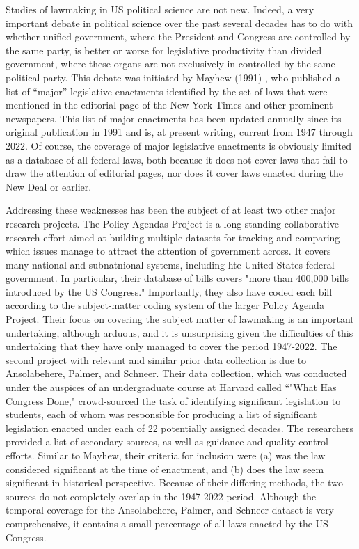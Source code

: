 \documentclass[fleqn,10pt]{wlscirep}
\begin{document}
Studies of lawmaking in US political science are not new. Indeed, a very important debate in political science over the past several decades has to do with whether unified government, where the President and Congress are controlled by the same party, is better or worse for legislative productivity than divided government, where these organs are not exclusively in controlled by the same political party. This debate was initiated by Mayhew (1991) \nocite{Mayhew1991}, who published a list of ``major'' legislative enactments identified by the set of laws that were mentioned in the editorial page of the New York Times and other prominent newspapers. This list of major enactments has been updated annually since its original publication in 1991 and is, at present writing, current from 1947 through 2022. Of course, the coverage of major legislative enactments is obviously limited as a database of all federal laws, both because it does not cover laws that fail to draw the attention of editorial pages, nor does it cover laws enacted during the New Deal or earlier. 

Addressing these weaknesses has been the subject of at least two other major research projects. The Policy Agendas Project is a long-standing collaborative research effort aimed at building multiple datasets for tracking and comparing which issues manage to attract the attention of government across. It covers many national and subnatnional systems, including hte United States federal government. In particular, their database of bills covers "more than 400,000 bills introduced by the US Congress." Importantly, they also have coded each bill according to the subject-matter coding system of the larger Policy Agenda Project. Their focus on covering the subject matter of lawmaking is an important undertaking, although arduous, and it is unsurprising given the difficulties of this undertaking that they have only managed to cover the period 1947-2022. The second project with relevant and similar prior data collection is due to Ansolabehere, Palmer, and Schneer.\cite{ansolabehere_palmer_schneer_2016,ansolabehere2018divided} Their data collection, which was conducted under the auspices of an undergraduate course at Harvard called ``"What Has Congress Done," crowd-sourced the task of identifying significant legislation to students, each of whom was responsible for producing a list of significant legislation enacted under each of 22 potentially assigned decades. The researchers provided a list of secondary sources, as well as guidance and quality control efforts. Similar to Mayhew, their criteria for inclusion were (a) was the law considered significant at the time of enactment, and (b) does the law seem significant in historical perspective. Because of their differing methods, the two sources do not completely overlap in the 1947-2022 period. Although the temporal coverage for the Ansolabehere, Palmer, and Schneer dataset is very comprehensive, it contains a small percentage of all laws enacted by the US Congress.
\end{document}
